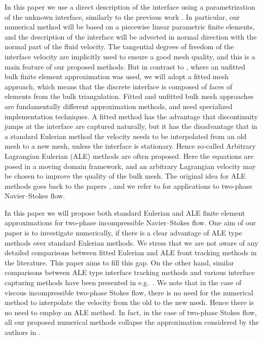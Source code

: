 \documentclass[a4paper,12pt,onecolumn]{article}
\begin{document}
In this paper we use a direct description of the interface using a
parametrization of the unknown interface, similarly to the previous work
\cite{fluidfbp}. In particular, our numerical method will be based
on a piecewise linear parametric finite elements, and the description of the
interface will be advected in normal direction
with the normal part of the fluid velocity. The tangential degrees
of freedom of the interface velocity are implicitly used to ensure a
good mesh quality, and this is a main feature of our proposed methods.
But in contrast to \cite{fluidfbp}, where an unfitted bulk finite element
approximation was used, we will adopt a fitted mesh approach, which means
that the discrete interface is composed of faces of elements from the bulk
triangulation. Fitted and unfitted bulk mesh approaches are fundamentally
different approximation methods, and need specialized implementation
techniques.
A fitted method has the advantage that discontinuity jumps
at the interface are captured naturally, but it has the disadvantage that in
a standard Eulerian method the velocity needs to be interpolated from
an old mesh to a new mesh, unless the interface is stationary. Hence so-called
Arbitrary Lagrangian Eulerian (ALE) methods are often proposed. Here
the equations are posed in a moving domain framework,
and an arbitrary Lagrangian velocity may be chosen to improve the quality of
the bulk mesh. The original idea for ALE methods goes back to
the papers \cite{Donea83,Hughes81}, and we refer to
\cite{Nobile99,NobilePhd,Formaggia04,Ganesan06,GanesanT08,HahnHT13,%
GanesanHST17} for applications to two-phase Navier--Stokes flow.

In this paper we will propose both standard Eulerian and
ALE finite element approximations for two-phase incompressible Navier--Stokes
flow. One aim of our paper is to investigate numerically, if there is a clear
advantage of ALE type methods over standard Eulerian methods.
We stress that we are not aware of any detailed comparisons between fitted
Eulerian and ALE front tracking methods in the literature.
This paper aims to fill this gap. On the other hand, similar
comparisons between ALE type interface tracking methods and various
interface capturing methods have been presented in e.g.\
\cite{HysingTKPBGT09,ElgetiS16}.
We note that in the case of viscous incompressible two-phase Stokes flow,
there is no need for the numerical method to interpolate the velocity from the
old to the new mesh. Hence there is no need to employ an ALE method. In fact,
in the case of two-phase Stokes flow, all our proposed numerical methods
collapse the approximation considered by the authors in \cite{stokesfitted}.
\end{document}
